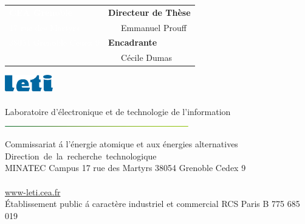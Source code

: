 \documentclass[francais]{rapport-leti}
\begin{document}
\begin{center}
\vspace{3.5cm}
\begin{tabular}{p{10cm}p{10cm}}
{\textcolor{white}{\bf CEA Grenoble}}                  &{\bf Directeur de Th\`ese}\\
{\textcolor{white}{\footnotesize 17 rue des Martyrs}}       & ~~~Emmanuel Prouff\\
{\textcolor{white}{\footnotesize 38054 Grenoble Cedex 9}}   &{\bf Encadrante}\\
{}                         & ~~~C\'ecile Dumas\\
\end{tabular}
\end{center}

\vspace{-8mm}
\noindent%
\small\includegraphics[height=0.7cm]{figures/leti.png}\\
  \color{blue!60!black}\\[-1.5ex]
  {Laboratoire d'\'electronique et de technologie de l'information}\\
  \includegraphics[height=0.5mm,width=8cm]{figures/greenline.png}

\footnotesize\color{gray!50!black}Commissariat \'a l'\'energie atomique et aux \'energies alternatives
  \hspace{1.9cm}\hbox{Direction de la recherche technologique}\\[-0.5ex]
  MINATEC Campus \textbar{} 17 rue des Martyrs \textbar{} 38054 Grenoble Cedex 9\\[-0.5ex]
      \\[-2.5ex]
  \url{www-leti.cea.fr}\\[-0.5ex]
  {\scriptsize \'Etablissement public \'a caract\`ere industriel et commercial RCS Paris B 775 685 019}


\normalsize

\newpage
\pagestyle{plain}
\tableofcontents
\newpage


\pagestyle{normal}







\end{document}
